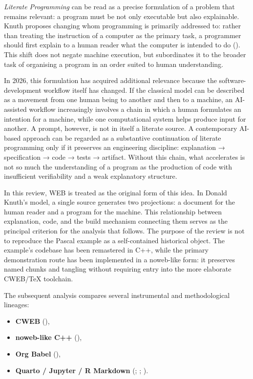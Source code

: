 \documentclass{ZGJournalArticle_2026}
\providecommand{\tightlist}{%
  \setlength{\itemsep}{0pt}\setlength{\parskip}{0pt}}
\begin{document}
\emph{Literate Programming} can be read as a precise formulation of a
problem that remains relevant: a program must be not only executable but
also explainable. Knuth proposes changing whom programming is primarily
addressed to: rather than treating the instruction of a computer as the
primary task, a programmer should first explain to a human reader what
the computer is intended to do ().
This shift does not negate machine execution, but subordinates it to the
broader task of organising a program in an order suited to human
understanding.

In 2026, this formulation has acquired additional relevance because the
software-development workflow itself has changed. If the classical model
can be described as a movement from one human being to another and then
to a machine, an AI-assisted workflow increasingly involves a chain in
which a human formulates an intention for a machine, while one
computational system helps produce input for another. A prompt, however,
is not in itself a literate source. A contemporary AI-based approach can
be regarded as a substantive continuation of literate programming only
if it preserves an engineering discipline: explanation → specification →
code → tests → artifact. Without this chain, what accelerates is not so
much the understanding of a program as the production of code with
insufficient verifiability and a weak explanatory structure.

In this review, WEB is treated as the original form of this idea. In
Donald Knuth's model, a single source generates two projections: a
document for the human reader and a program for the machine. This
relationship between explanation, code, and the build mechanism
connecting them serves as the principal criterion for the analysis that
follows. The purpose of the review is not to reproduce the Pascal
example as a self-contained historical object. The example's codebase
has been remastered in C++, while the primary demonstration route has
been implemented in a noweb-like form: it preserves named chunks and
tangling without requiring entry into the more elaborate CWEB/TeX
toolchain.

The subsequent analysis compares several instrumental and methodological
lineages:

\begin{itemize}
\tightlist
\item
  \textbf{CWEB} (),
\item
  \textbf{noweb-like C++} (),
\item
  \textbf{Org Babel}
  (),
\item
  \textbf{Quarto / Jupyter / R Markdown}
  (;
  ;
  ).
\end{itemize}
\end{document}
